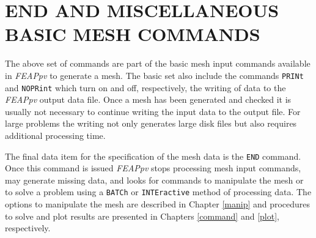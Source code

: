 \chapter[End and Miscellaneous Commands]
{END AND MISCELLANEOUS BASIC MESH COMMANDS}
\label{end}

The above set of commands are part of the basic mesh input commands
available in {\sl FEAPpv} to generate a mesh.  The basic set
also include the commands {\tt PRINt} and {\tt NOPRint} which turn on
and off, respectively, the writing of data to the {\sl FEAPpv} output data file.
Once a mesh has been generated and checked it is usually not necessary to
continue writing the input data to the output file.  For large problems
the writing not only generates large disk files but also requires
additional processing time.

The final data item for the specification of the mesh data is the {\tt END}
command.  Once this command is issued {\sl FEAPpv} stops processing mesh
input commands, may generate missing data,
and looks for commands to manipulate the mesh or to solve
a problem using a {\tt BATCh} or {\tt INTEractive} method of processing
data.  The options to manipulate the mesh are described in Chapter \ref{manip}
and procedures to solve and plot results are presented
in Chapters \ref{command} and \ref{plot}, respectively.
